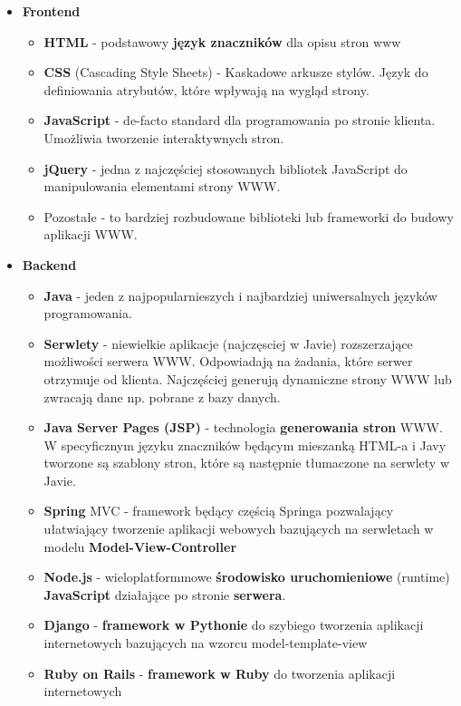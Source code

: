 \documentclass[../main.tex]{subfiles}
\begin{document}
    \begin{itemize}
        \item \textbf{Frontend}
        \begin{itemize}
            \item \textbf{HTML} - podstawowy \textbf{język znaczników} dla opisu stron www
            \item \textbf{CSS} (Cascading Style Sheets) - Kaskadowe arkusze stylów. Język do definiowania atrybutów, które wpływają na wygląd strony.
            \item \textbf{JavaScript} - de-facto standard dla programowania po stronie klienta. Umożliwia tworzenie interaktywnych stron.
            \item \textbf{jQuery} - jedna z najczęściej stosowanych bibliotek JavaScript do manipulowania elementami strony WWW.
            \item Pozostałe - to bardziej rozbudowane biblioteki lub frameworki do budowy aplikacji WWW.
        \end{itemize}
        \item \textbf{Backend}
        \begin{itemize}
            \item \textbf{Java} - jeden z najpopularnieszych i najbardziej uniwersalnych języków programowania.
            \item \textbf{Serwlety} - niewielkie aplikacje (najczęsciej w Javie) rozszerzające możliwości serwera WWW. Odpowiadają na żadania, które serwer otrzymuje od klienta. Najczęściej generują dynamiczne strony WWW lub zwracają dane np. pobrane z bazy danych.
            \item \textbf{Java Server Pages (JSP)} - technologia \textbf{generowania stron} WWW. W specyficznym języku znaczników będącym mieszanką HTML-a i Javy tworzone są szablony stron, które są następnie tłumaczone na serwlety w Javie.
            \item \textbf{Spring} MVC - framework będący częścią Springa pozwalający ułatwiający tworzenie aplikacji webowych bazujących na serwletach w modelu \textbf{Model-View-Controller}
            \item \textbf{Node.js} - wieloplatformmowe \textbf{środowisko uruchomieniowe} (runtime) \textbf{JavaScript} działające po stronie \textbf{serwera}.
            \item \textbf{Django} - \textbf{framework w Pythonie} do szybiego tworzenia aplikacji internetowych bazujących na wzorcu model-template-view
            \item \textbf{Ruby on Rails} - \textbf{framework w Ruby} do tworzenia aplikacji internetowych

\end{itemize}
\end{itemize}
\end{document}
